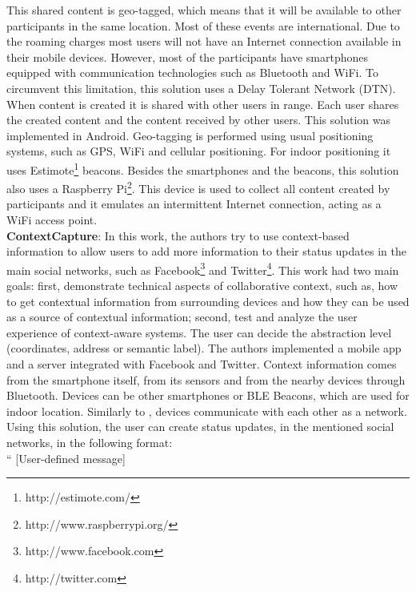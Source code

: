 This shared content is geo-tagged, which means that
it will be available to other participants in the same
location.
Most of these events are international. 
Due to the
roaming charges most users will not have an
Internet connection available in their mobile devices.
However, most of the participants have smartphones
equipped with communication technologies such as
Bluetooth and WiFi.
To circumvent this limitation, this solution
uses a Delay Tolerant Network (DTN)\cite{pateldelay}.
When content is created it is shared with other
users in range. Each user shares the created content and the content received by other users.
This solution was implemented in Android.
Geo-tagging is performed using usual positioning
systems, such as GPS, WiFi and cellular positioning.
For indoor positioning it uses 
Estimote\footnote{http://estimote.com/} beacons.
Besides the smartphones and the beacons, this
solution also uses a 
Raspberry Pi\footnote{http://www.raspberrypi.org/}.
This device is used to collect all content created by
participants and it emulates an intermittent Internet
connection, acting as a WiFi access point.
\\
\textbf{ContextCapture}\cite{Antila2011}:
In this work, the authors try to use
context-based information to allow users to
add more information to their status updates
in the main social networks, such as
Facebook\footnote{http://www.facebook.com} and 
Twitter\footnote{http://twitter.com}.
This work had two main goals: first, demonstrate technical
aspects of collaborative context, such as,
how to get contextual information from
surrounding devices and how they can be used
as a source of contextual information;
second, test and analyze the user experience of
context-aware systems.
The user can decide the abstraction level (coordinates,
address or semantic label).
The authors implemented a mobile app and a
server integrated with Facebook and Twitter.
Context information comes from the smartphone itself,
from its sensors and from the nearby devices through
Bluetooth. 
Devices can be other smartphones or BLE Beacons, which
are used for indoor location.
Similarly to \cite{BenAbdesslem2014}, devices communicate
with each other as a network.
Using this solution, the user can create status updates,
in the mentioned social networks, in the following format:
\\
``
[User-defined message] 

